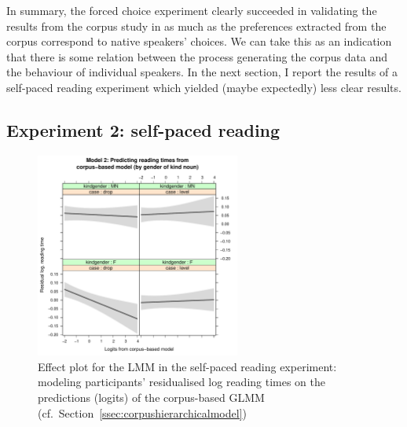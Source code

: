 \documentclass[USenglish]{article}
\begin{document}
In summary, the forced choice experiment clearly succeeded in validating the results from the corpus study in as much as the preferences extracted from the corpus correspond to native speakers' choices.
We can take this as an indication that there is some relation between the process generating the corpus data and the behaviour of individual speakers.
In the next section, I report the results of a self-paced reading experiment which yielded (maybe expectedly) less clear results.


\subsection{Experiment 2: self-paced reading}



\begin{figure}[h]
\centering
\includegraphics[width=0.6\textwidth]{figures/experiment/spr_effects_case+modelPred+gender}
\caption{Effect plot for the LMM in the self-paced reading experiment: modeling participants' residualised log reading times on the predictions (logits) of the corpus-based GLMM (cf.\ Section~\ref{ssec:corpushierarchicalmodel})}
\label{fig:spr:continuous:effects}
\end{figure}
\end{document}

